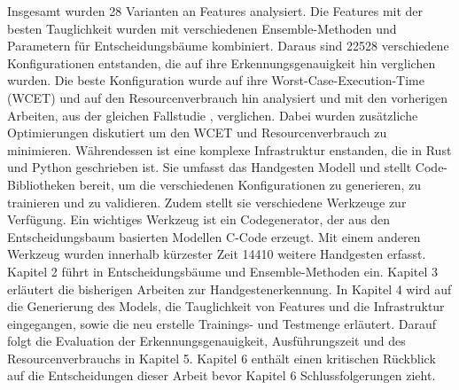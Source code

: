 \newline
\newline
Insgesamt wurden 28 Varianten an Features analysiert. Die Features mit der besten Tauglichkeit wurden mit verschiedenen Ensemble-Methoden und Parametern für Entscheidungsbäume kombiniert. Daraus sind
22528 verschiedene Konfigurationen entstanden, die auf ihre Erkennungsgenauigkeit hin verglichen wurden. Die beste Konfiguration wurde auf ihre Worst-Case-Execution-Time (WCET) und auf den Resourcenverbrauch
hin analysiert und mit den vorherigen Arbeiten, aus der gleichen Fallstudie \cite{venzkeArticle}, verglichen. Dabei wurden zusätzliche Optimierungen diskutiert um den WCET und Resourcenverbrauch zu minimieren.
Währendessen ist eine komplexe Infrastruktur enstanden, die in Rust und Python geschrieben ist. Sie umfasst das Handgesten Modell und stellt Code-Bibliotheken bereit,
um die verschiedenen Konfigurationen zu generieren, zu trainieren und zu validieren. Zudem stellt sie verschiedene Werkzeuge zur Verfügung. Ein wichtiges Werkzeug ist ein Codegenerator,
der aus den Entscheidungsbaum basierten Modellen C-Code erzeugt. Mit einem anderen Werkzeug wurden innerhalb kürzester Zeit 14410 weitere Handgesten erfasst.
\newline
\newline
Kapitel 2 führt in Entscheidungsbäume und Ensemble-Methoden ein. Kapitel 3 erläutert die bisherigen Arbeiten zur Handgestenerkennung. In Kapitel 4 wird auf die Generierung des Models, die Tauglichkeit von
Features und die Infrastruktur eingegangen, sowie die neu erstelle Trainings- und Testmenge erläutert. Darauf folgt die Evaluation der Erkennungsgenauigkeit, Ausführungszeit und des Resourcenverbrauchs in
Kapitel 5. Kapitel 6 enthält einen kritischen Rückblick auf die Entscheidungen dieser Arbeit bevor Kapitel 6 Schlussfolgerungen zieht.
